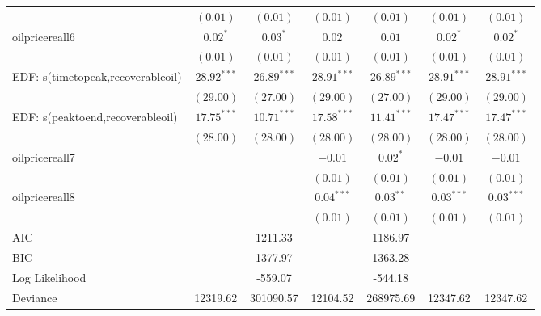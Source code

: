 \documentclass[12pt]{article}
\begin{document}
\begin{table}
\begin{center}
\begin{tabular}{l c c c c c c }
                                     & $(0.01)$      & $(0.01)$      & $(0.01)$      & $(0.01)$      & $(0.01)$      & $(0.01)$      \\
oilpricereall6                    & $0.02^{*}$    & $0.03^{*}$    & $0.02$        & $0.01$        & $0.02^{*}$    & $0.02^{*}$    \\
                                     & $(0.01)$      & $(0.01)$      & $(0.01)$      & $(0.01)$      & $(0.01)$      & $(0.01)$      \\
EDF: s(timetopeak,recoverableoil) & $28.92^{***}$ & $26.89^{***}$ & $28.91^{***}$ & $26.89^{***}$ & $28.91^{***}$ & $28.91^{***}$ \\
                                     & $(29.00)$     & $(27.00)$     & $(29.00)$     & $(27.00)$     & $(29.00)$     & $(29.00)$     \\
EDF: s(peaktoend,recoverableoil)  & $17.75^{***}$ & $10.71^{***}$ & $17.58^{***}$ & $11.41^{***}$ & $17.47^{***}$ & $17.47^{***}$ \\
                                     & $(28.00)$     & $(28.00)$     & $(28.00)$     & $(28.00)$     & $(28.00)$     & $(28.00)$     \\
oilpricereall7                    &               &               & $-0.01$       & $0.02^{*}$    & $-0.01$       & $-0.01$       \\
                                     &               &               & $(0.01)$      & $(0.01)$      & $(0.01)$      & $(0.01)$      \\
oilpricereall8                    &               &               & $0.04^{***}$  & $0.03^{**}$   & $0.03^{***}$  & $0.03^{***}$  \\
                                     &               &               & $(0.01)$      & $(0.01)$      & $(0.01)$      & $(0.01)$      \\
\hline
AIC                                  &               & 1211.33       &               & 1186.97       &               &               \\
BIC                                  &               & 1377.97       &               & 1363.28       &               &               \\
Log Likelihood                       &               & -559.07       &               & -544.18       &               &               \\
Deviance                             & 12319.62      & 301090.57     & 12104.52      & 268975.69     & 12347.62      & 12347.62      \\

\end{tabular}
\end{center}
\end{table}
\end{document}
